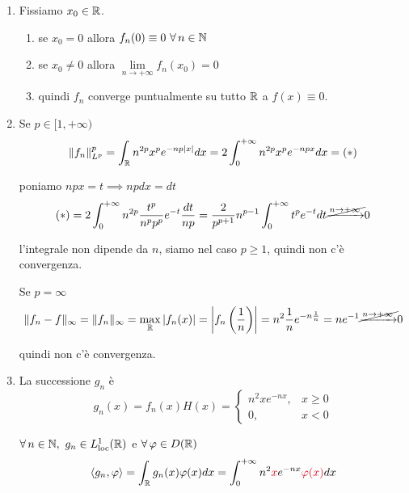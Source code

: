 \begin{enumerate}
\item Fissiamo $x_{0} \in \mathbb{R} $.
\begin{enumerate}
\item se $x_{0} =0$ allora $f_{n}( 0) \equiv 0\ \forall n\in \NN $
\item se $x_{0} \neq 0$ allora $\lim\limits _{n\rightarrow +\infty } f_{n}( x_{0}) =0$
\item quindi $f_{n}$ converge puntualmente su tutto $\mathbb{R} $ a $f( x) \equiv 0$.
\end{enumerate}

\item Se $p\in [ 1,+\infty )$\begin{equation*}
\Vert f_{n}\Vert ^{p}_{L^{p}} =\int _{\mathbb{R} } n^{2p} x^{p} e^{-np| x| } dx=2\int ^{+\infty }_{0} n^{2p} x^{p} e^{-npx} dx=( *)
\end{equation*}

poniamo $npx=t\implies npdx=dt$\begin{equation*}
( *) =2\int ^{+\infty }_{0} n^{2p}\frac{t^{p}}{n^{p} p^{p}} e^{-t}\frac{dt}{np} =\frac{2}{p^{p+1}} n^{p-1}\int ^{+\infty }_{0} t^{p} e^{-t} dt\cancel{\xrightarrow{n\rightarrow +\infty }} 0
\end{equation*}

l'integrale non dipende da $n$, siamo nel caso $p\geqslant 1$, quindi non c'è convergenza.

Se $p=\infty $\begin{equation*}
\Vert f_{n} -f\Vert _{\infty } =\Vert f_{n}\Vert _{\infty } =\max_{\mathbb{R} }| f_{n}( x)| =\left| f_{n}\left(\frac{1}{n}\right)\right| =n^{2}\frac{1}{n} e^{-n\frac{1}{n}} =ne^{-1}\cancel{\xrightarrow{n\rightarrow +\infty }} 0
\end{equation*}

quindi non c'è convergenza.
\item La successione $g_{n}$ è\begin{equation*}
g_{n}( x) =f_{n}( x) H( x) =\begin{cases}
n^{2} xe^{-nx} , & x\geqslant 0\\
0, & x< 0
\end{cases}
\end{equation*}

$\forall n\in \NN  ,\ g_{n} \in L^{1}_{\loc}(\RR )$ e $\forall \varphi \in D(\RR )$\begin{equation*}
\langle g_{n} ,\varphi \rangle =\int _{\RR } g_{n}( x) \varphi ( x) dx=\int ^{+\infty }_{0} n^{2}\textcolor[rgb]{0.82,0.01,0.11}{x} e^{-nx}\textcolor[rgb]{0.82,0.01,0.11}{\varphi }\textcolor[rgb]{0.82,0.01,0.11}{(}\textcolor[rgb]{0.82,0.01,0.11}{x}\textcolor[rgb]{0.82,0.01,0.11}{)} dx
\end{equation*}


\end{enumerate}
